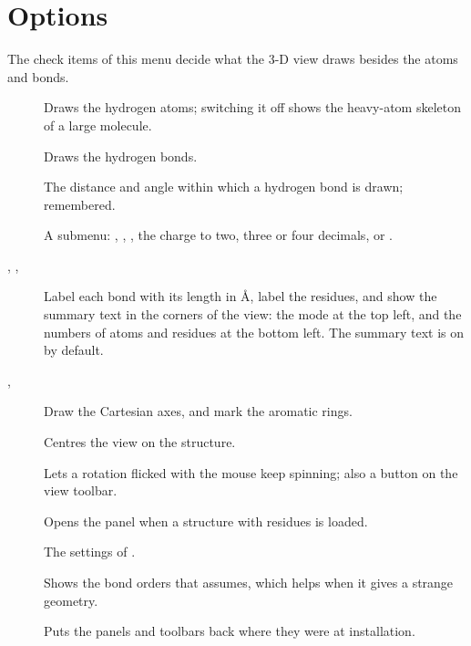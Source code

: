 \section{Options}
The check items of this menu decide what the 3-D view draws besides the atoms and bonds.
\begin{description}
	\item[] Draws the hydrogen atoms; switching it off shows the heavy-atom skeleton of a large molecule.
	\item[] Draws the hydrogen bonds.
	\item[] The distance and angle within which a hydrogen bond is drawn; remembered.
	\item[] A submenu: , , , the charge to two, three or four decimals, or .
	\item[, , ] Label each bond with its length in \AA, label the residues, and show the summary text in the corners of the view: the mode at the top left, and the numbers of atoms and residues at the bottom left. The summary text is on by default.
	\item[, ] Draw the Cartesian axes, and mark the aromatic rings.
	\item[] Centres the view on the structure.
	\item[] Lets a rotation flicked with the mouse keep spinning; also a button on the view toolbar.
	\item[] Opens the  panel when a structure with residues is loaded.
	\item[] The settings of .
	\item[] Shows the bond orders that  assumes, which helps when it gives a strange geometry.
	\item[] Puts the panels and toolbars back where they were at installation.
\end{description}

